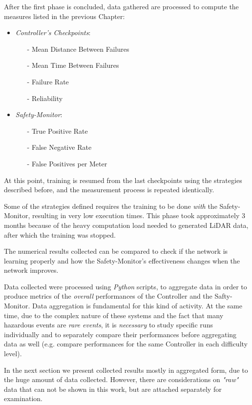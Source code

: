 After the first phase is concluded, data gathered are processed to compute the measures listed in the previous Chapter:

\begin{itemize}
	\item \textsl{Controller's Checkpoints}:
	\begin{itemize}
		\item[-] Mean Distance Between Failures
		\item[-] Mean Time Between Failures
		\item[-] Failure Rate
		\item[-] Reliability
	\end{itemize}
	\item \textsl{Safety-Monitor}:
	\begin{itemize}
		\item[-] True Positive Rate
		\item[-] False Negative Rate
		\item[-] False Positives per Meter
	\end{itemize}
\end{itemize}

At this point, training is resumed from the last checkpoints using the strategies described before, and the measurement process is repeated identically.

Some of the strategies defined requires the training to be done \textsl{with} the Safety-Monitor, resulting in very low execution times. This phase took approximately 3 months because of the heavy computation load needed to generated LiDAR data, after which the training was stopped.

The numerical results collected can be compared to check if the network is learning properly and how the Safety-Monitor's effectiveness changes when the network improves.

Data collected were processed using \textsl{Python} scripts, to aggregate data in order to produce metrics of the \textsl{overall} performances of the Controller and the Safty-Monitor.
Data aggregation is fundamental for this kind of activity. At the same time, due to the complex nature of these systems and the fact that many hazardous events are \textsl{rare events}, it is \textsl{necessary} to study specific runs individually and to separately compare their performances before aggregating data as well (e.g. compare performances for the same Controller in each difficulty level).

In the next section we present collected results mostly in aggregated form, due to the huge amount of data collected. However, there are considerations on \textsl{"raw"} data that can not be shown in this work, but are attached separately for examination.

